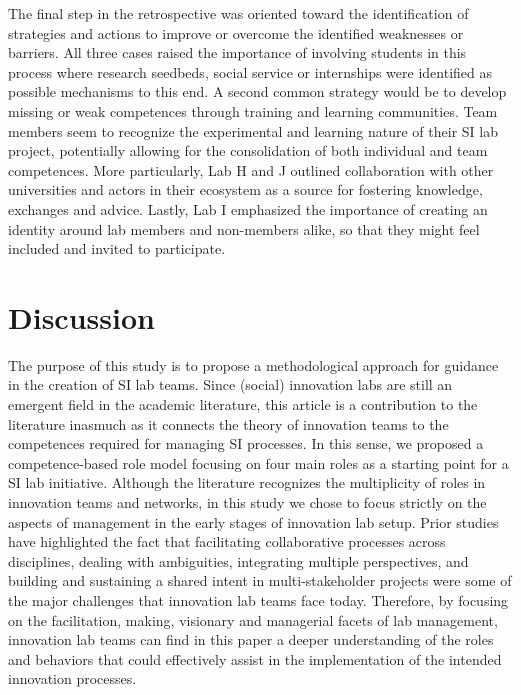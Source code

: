 \documentclass[AMA,STIX1COL,APA,STIX2COL]{WileyNJD-v2}
\begin{document}
The final step in the retrospective was oriented toward the
identification of strategies and actions to improve or overcome the
identified weaknesses or barriers. All three cases raised the importance
of involving students in this process where research seedbeds, social
service or internships were identified as possible mechanisms to this
end. A second common strategy would be to develop missing or weak
competences through training and learning communities. Team members seem
to recognize the experimental and learning nature of their SI lab
project, potentially allowing for the consolidation of both individual
and team competences. More particularly, Lab H and J outlined
collaboration with other universities and actors in their ecosystem as a
source for fostering knowledge, exchanges and advice. Lastly, Lab I
emphasized the importance of creating an identity around lab members and
non-members alike, so that they might feel included and invited to
participate.

\hypertarget{discussion}{%
\section{Discussion}\label{discussion}}

The purpose of this study is to propose a methodological approach for
guidance in the creation of SI lab teams. Since (social) innovation labs
are still an emergent field in the academic literature, this article is
a contribution to the literature inasmuch as it connects the theory of
innovation teams to the competences required for managing SI processes.
In this sense, we proposed a competence-based role model focusing on
four main roles as a starting point for a SI lab initiative. Although
the literature recognizes the multiplicity of roles in innovation teams
and networks, in this study we chose to focus strictly on the aspects of
management in the early stages of innovation lab setup. Prior studies
have highlighted the fact that facilitating collaborative processes
across disciplines, dealing with ambiguities, integrating multiple
perspectives, and building and sustaining a shared intent in
multi-stakeholder projects were some of the major challenges that
innovation lab teams face today. Therefore, by focusing on the
facilitation, making, visionary and managerial facets of lab management,
innovation lab teams can find in this paper a deeper understanding of
the roles and behaviors that could effectively assist in the
implementation of the intended innovation processes.
\end{document}
